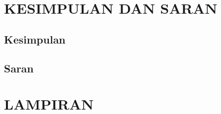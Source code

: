 \documentclass[12pt,a4paper]{report}
\begin{document}
\chapter{KESIMPULAN DAN SARAN}
\section{Kesimpulan}
\section{Saran}

\clearpage
{}

\renewcommand{\bibname}{DAFTAR PUSTAKA}


\appendix
\chapter{LAMPIRAN}
\end{document}
